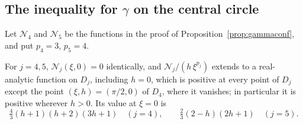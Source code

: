 \subsection{The inequality for \texorpdfstring{$\gamma$}{gamma} on the central circle}

Let $\mathcal N_4$ and $\mathcal N_5$ be the functions in the proof of Proposition~\ref{prop:gammaconf}, and put $p_4=3$, $p_5=4$.

\begin{lemma}\label{lem:ineqC}
For $j=4,5$, $\mathcal N_j(\xi,0)=0$ identically, and $\mathcal N_j/(h\,\xi^{p_j})$ extends to a real-analytic function on
$D_j$, including $h=0$, which is positive at every point of $D_j$ except the point $(\xi,h)=(\pi/2,0)$ of $D_4$, where it
vanishes; in particular it is positive wherever $h>0$. Its value at $\xi=0$ is
\[
\tfrac43(h+1)(h+2)(3h+1)\quad(j=4),\qquad \tfrac23(2-h)(2h+1)\quad(j=5).
\]
\end{lemma}


